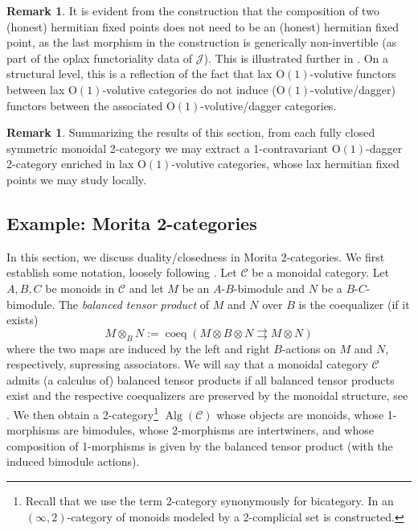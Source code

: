 \documentclass{article}
\newcommand{\Alg}{\operatorname{Alg}}%
\newcommand{\coeq}{\operatorname{coeq}}%
\newcommand{\Oone}{\operatorname{O(1)}}
\newcommand{\C}{\mathcal{C}}
\numberwithin{equation}{section}
\theoremstyle{definition}
\newtheorem{remark}[definition]{Remark}
\theoremstyle{theorem}
\begin{document}
\begin{remark}
    It is evident from the construction that the composition of two (honest) hermitian fixed points does not need to be an (honest) hermitian fixed point, 
    as the last morphism in the construction is generically non-invertible (as part of the oplax functoriality data of $\mathcal{J}$). This is illustrated further 
    in . On a structural level, this is a reflection of the fact that lax $\Oone$-volutive functors between lax 
    $\Oone$-volutive categories do not induce ($\Oone$-volutive/dagger) functors between the associated $\Oone$-volutive/dagger categories. 
\end{remark}
\begin{remark}
    Summarizing the results of this section, from each fully closed symmetric monoidal 2-category we may extract a 1-contravariant $\Oone$-dagger 2-category 
    enriched in lax $\Oone$-volutive categories, whose lax hermitian fixed points we may study locally.
\end{remark}

\subsection{Example: Morita 2-categories}\label{Subsection: Morita 2-categories}
In this section, we discuss duality/closedness in Morita 2-categories. We first establish some notation, loosely following \cite{dutta2025moritainfty}. 
Let $\C$ be a monoidal category. Let $A,B,C$ be monoids in $\C$ and let $M$ be an $A$-$B$-bimodule and $N$ be a $B$-$C$-bimodule. 
The \emph{balanced tensor product} of $M$ and $N$ over $B$ is the coequalizer (if it exists)
\begin{equation}
    M \otimes_B N := \coeq \left( M \otimes B \otimes N \rightrightarrows M \otimes N \right)
\end{equation}
where the two maps are induced by the left and right $B$-actions on $M$ and $N$, respectively, supressing associators. We will say that a monoidal category
$\C$ admits (a calculus of) balanced tensor products if all balanced tensor products exist and the respective coequalizers are preserved by the monoidal 
structure, see \cite[Definition 2.7]{dutta2025moritainfty}. We then obtain a 2-category\footnote{Recall that we use the term 2-category synonymously for bicategory. 
In \cite{dutta2025moritainfty} an $(\infty,2)$-category of monoids modeled by a 2-complicial set is constructed.} $\Alg(\C)$ whose objects are monoids, whose 1-morphisms 
are bimodules, whose 2-morphisms are intertwiners, and whose composition of 1-morphisms is given by the balanced tensor product (with the induced bimodule actions).\\
\end{document}
